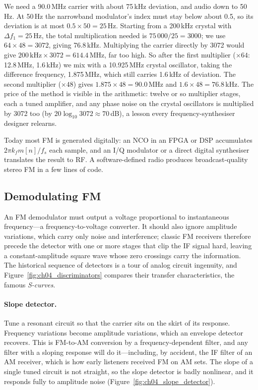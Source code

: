 \begin{worked}
We need a 90.0\,MHz carrier with about 75\,kHz deviation, and audio down to 50\,Hz. At 50\,Hz the
narrowband modulator's index must stay below about 0.5, so its deviation is at most $0.5\times50=25$\,Hz.
Starting from a 200\,kHz crystal with $\Delta f_1=25$\,Hz, the total multiplication needed is
$75\,000/25=3000$; we use $64\times48=3072$, giving 76.8\,kHz. Multiplying the carrier directly by 3072
would give $200\,\text{kHz}\times3072=614.4$\,MHz, far too high. So after the first multiplier
($\times64$: 12.8\,MHz, 1.6\,kHz) we mix with a 10.925\,MHz crystal oscillator, taking the difference
frequency, 1.875\,MHz, which still carries 1.6\,kHz of deviation. The second multiplier ($\times48$) gives
$1.875\times48=90.0$\,MHz and $1.6\times48=76.8$\,kHz. The price of the method is visible in the
arithmetic: twelve or so multiplier stages, each a tuned amplifier, and any phase noise on the crystal
oscillators is multiplied by 3072 too (by $20\log_{10}3072\approx70$\,dB), a lesson every
frequency-synthesiser designer relearns.
\end{worked}

Today most FM is generated digitally: an NCO in an FPGA or DSP accumulates $2\pi k_f m[n]/f_s$ each
sample, and an I/Q modulator or a direct digital synthesiser translates the result to RF. A
software-defined radio produces broadcast-quality stereo FM in a few lines of code.

\subsection{Demodulating FM}
\label{sec:ch04:fmdemod}

An FM demodulator must output a voltage proportional to instantaneous frequency---a frequency-to-voltage
converter. It should also ignore amplitude variations, which carry only noise and interference; classic FM
receivers therefore precede the detector with one or more  stages that clip the IF signal
hard, leaving a constant-amplitude square wave whose zero crossings carry the information. The historical
sequence of detectors is a tour of analog circuit ingenuity, and Figure~\ref{fig:ch04_discriminators}
compares their transfer characteristics, the famous \emph{S-curves}.

\paragraph{Slope detector.} Tune a resonant circuit so that the carrier sits on the skirt of its response.
Frequency variations become amplitude variations, which an envelope detector recovers. This is FM-to-AM
conversion by a frequency-dependent filter, and any filter with a sloping response will do it---including,
by accident, the IF filter of an AM receiver, which is how early listeners received FM on AM sets. The
slope of a single tuned circuit is not straight, so the slope detector is badly nonlinear, and it responds
fully to amplitude noise (Figure~\ref{fig:ch04_slope_detector}).

